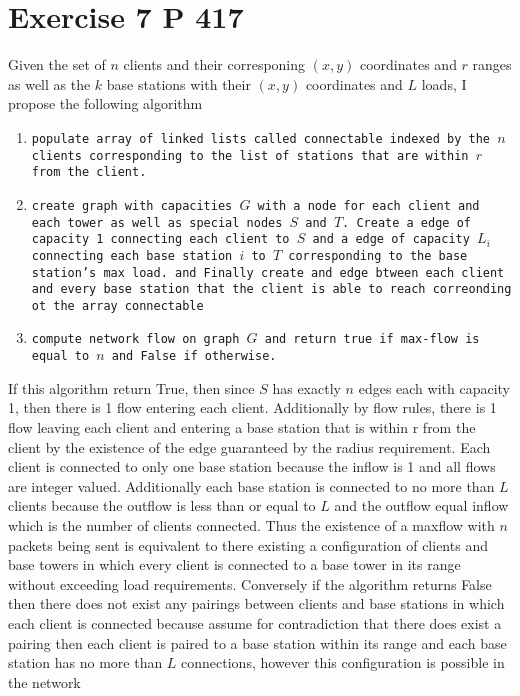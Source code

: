 \documentclass{amsart}
\begin{document}
\section{Exercise 7 P 417}
Given the set of $n$ clients and their corresponing $(x,y)$ coordinates and $r$ ranges as well as the $k$ base stations with their $(x,y)$ coordinates and $L$ loads, I propose the following algorithm
{\small
    \begin{enumerate}
        \item \texttt{populate array of linked lists called connectable indexed by the $n$ clients  corresponding to the list of stations that are within $r$ from the client.}
        \item \texttt{create graph with capacities $G$ with a node for each client and each tower as well as special nodes $S$ and $T$. Create a edge of capacity 1 connecting each client to $S$ and a edge of capacity $L_i$ connecting each
            base station $i$ to $T$ corresponding to the base station's max load. and Finally create and edge btween each client and every base station that the client is able to reach correonding ot the  array connectable}
        \item \texttt{compute network flow on graph $G$ and return true if max-flow is equal to $n$ and False if otherwise.}
    \end{enumerate}
}
If this algorithm return True, then since $S$ has exactly $n$ edges each with capacity 1, then there is 1 flow entering each client. Additionally  by flow rules, there is 1 flow leaving each
client and entering a base station that is within r from the client by the existence of the edge guaranteed by the radius requirement. Each client is connected to only one base station because the inflow
is 1 and all flows are integer valued. Additionally each base station is connected to no more than $L$ clients because the outflow is less than or equal to $L$ and the outflow equal inflow which is the number of
clients connected. Thus the existence of a maxflow with $n$ packets being sent is equivalent to there existing a configuration of clients and base towers in which every client is connected to a base tower in its range without
exceeding load requirements. Conversely if the algorithm returns False then there does not exist any pairings between clients and base stations in which each client is connected because assume for contradiction that there
does exist a pairing then each client is paired to a base station  within its range and each base station has no more than $L$ connections, however this configuration is possible in the network
\end{document}
